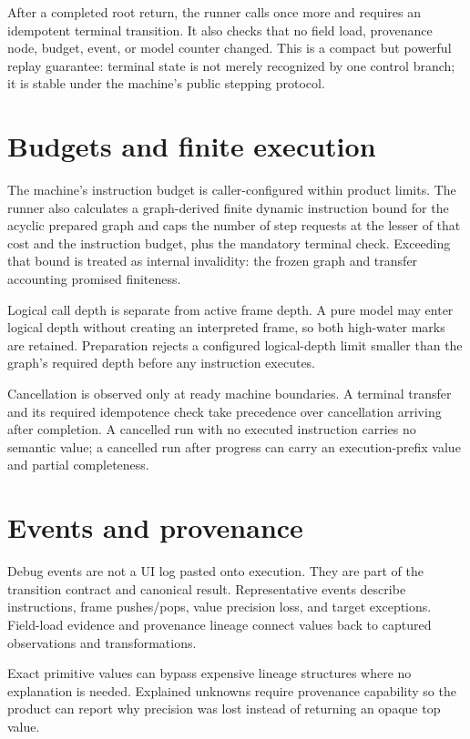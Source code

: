 \documentclass[11pt,oneside,openany]{book}
\newcommand{\typeName}[1]{\texttt{\detokenize{#1}}}
\begin{document}
After a completed root return, the runner calls \typeName{StepOne} once more and requires an idempotent terminal transition. It also checks that no field load, provenance node, budget, event, or model counter changed. This is a compact but powerful replay guarantee: terminal state is not merely recognized by one control branch; it is stable under the machine's public stepping protocol.

\section{Budgets and finite execution}

The machine's instruction budget is caller-configured within product limits. The runner also calculates a graph-derived finite dynamic instruction bound for the acyclic prepared graph and caps the number of step requests at the lesser of that cost and the instruction budget, plus the mandatory terminal check. Exceeding that bound is treated as internal invalidity: the frozen graph and transfer accounting promised finiteness.

Logical call depth is separate from active frame depth. A pure model may enter logical depth without creating an interpreted frame, so both high-water marks are retained. Preparation rejects a configured logical-depth limit smaller than the graph's required depth before any instruction executes.

Cancellation is observed only at ready machine boundaries. A terminal transfer and its required idempotence check take precedence over cancellation arriving after completion. A cancelled run with no executed instruction carries no semantic value; a cancelled run after progress can carry an execution-prefix value and partial completeness.

\section{Events and provenance}

Debug events are not a UI log pasted onto execution. They are part of the transition contract and canonical result. Representative events describe instructions, frame pushes/pops, value precision loss, and target exceptions. Field-load evidence and provenance lineage connect values back to captured observations and transformations.

Exact primitive values can bypass expensive lineage structures where no explanation is needed. Explained unknowns require provenance capability so the product can report why precision was lost instead of returning an opaque top value.
\end{document}
